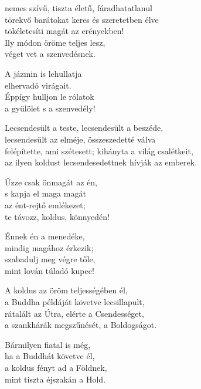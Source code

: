 \begin{dhpverse}

nemes szívű, tiszta életű, fáradhatatlanul\\
törekvő barátokat keres és szeretetben élve\\
tökéletesíti magát az erényekben!\\
Ily módon öröme teljes lesz,\\
véget vet a szenvedésnek.

 A jázmin is lehullatja\\
elhervadó virágait.\\
Éppígy hulljon le rólatok\\
a gyűlölet s a szenvedély!

 Lecsendesült a teste, lecsendesült a beszéde,\\
lecsendesült az elméje, összeszedetté válva\\
felépítette, ami szétesett; kihányta a világ csalétkeit,\\
az ilyen koldust lecsendesedettnek hívják az emberek.

 Űzze csak önmagát az én,\\
s kapja el maga magát\\
az ént-rejtő emlékezet;\\
te távozz, koldus, könnyedén!

 Énnek én a menedéke,\\
mindig magához érkezik;\\
szabadulj meg végre tőle,\\
mint lován túladó kupec!

 A koldus az öröm teljességében él,\\
a Buddha példáját követve lecsillapult,\\
rátalált az Útra, elérte a Csendességet,\\
a szankhárák megszűnését, a Boldogságot.

\end{dhpverse}
\newpage
\begin{dhpverse}

 Bármilyen fiatal is még,\\
ha a Buddhát követve él,\\
a koldus fényt ad a Földnek,\\
mint tiszta éjszakán a Hold.

\end{dhpverse}
